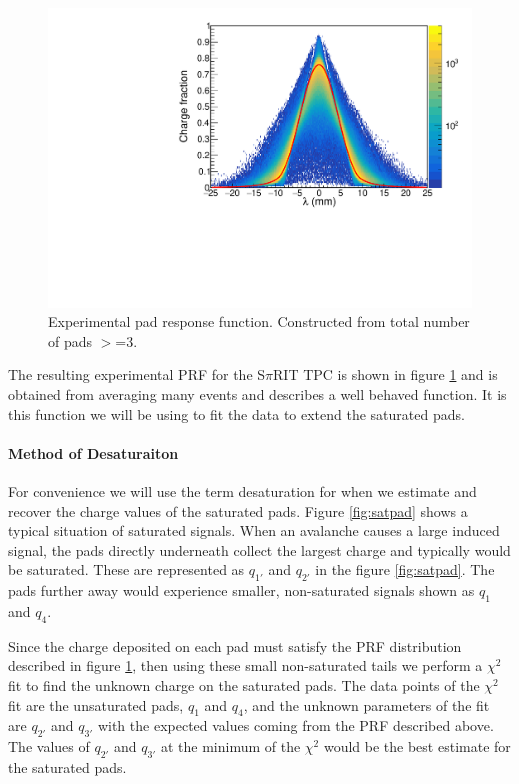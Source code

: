 \documentclass[review]{elsarticle}
\begin{document}
\begin{figure}[H]
\includegraphics[width=\linewidth]{expprf}
\caption{Experimental pad response function. Constructed from total number of pads $>$=3. }
\label{fig:expprf}
\end{figure}

The resulting experimental PRF for the S$\pi$RIT TPC is shown in figure \ref{fig:expprf} and is obtained from averaging many events and describes a well behaved function. It is this function we will be using to fit the data to extend the saturated pads. 

\paragraph{Method of Desaturaiton}

For convenience we will use the term desaturation for when we estimate and recover the charge values of the saturated pads. Figure \ref{fig:satpad} shows a typical situation of saturated signals. When an avalanche causes a large induced signal, the pads directly underneath collect the largest charge and typically would be saturated. These are represented as $q_{1'}$ and $q_{2'}$ in the figure \ref{fig:satpad}. The pads further away would experience smaller, non-saturated signals shown as $q_{1}$ and $q_{4}$.

Since the charge deposited on each  pad must satisfy the PRF distribution described in figure \ref{fig:expprf}, then using these small non-saturated tails we perform a $\chi^2$ fit to find the unknown charge on the saturated pads. The data points of the $\chi^2$ fit are the unsaturated pads,  $q_{1}$ and $q_{4}$, and the unknown parameters of the fit are $q_{2'}$ and $q_{3'}$ with the expected values coming from the PRF described above. The values of $q_{2'}$ and $q_{3'}$ at the minimum of the $\chi^2$ would be the best estimate for the saturated pads. 
\end{document}
